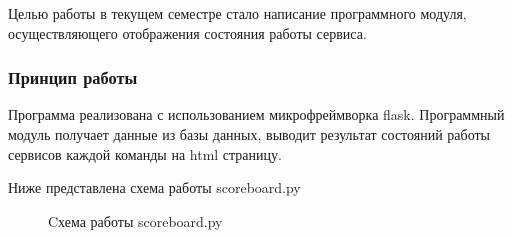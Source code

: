 Целью работы в текущем семестре стало написание программного модуля, осуществляющего отображения состояния работы сервиса.

\subsubsection{Принцип работы}

Программа реализована с использованием микрофреймворка flask. Программный модуль получает данные из базы данных, выводит результат состояний работы сервисов каждой команды на html страницу.

Ниже представлена схема работы scoreboard.py

\begin{figure}[ht!]
\caption{Cхема работы scoreboard.py}
\end{figure}

\clearpage
